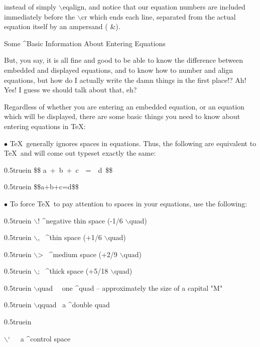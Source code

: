 instead of simply {\twltt $\backslash$eqalign}, and notice that our equation
numbers are included immediately before the {\twltt $\backslash$cr} which ends
each line, separated from the actual equation itself by an ampersand ({\twltt
\&}).
\vfill\eject
\centerline{\twlbf Some ^{Basic Information About Entering Equations}}
\bigskip\par\noindent
But, you say, it is all fine and good to be able to know the
difference between embedded and displayed equations, and to know
how to number and align equations,
but how do I actually write the damn things in the first place!{}?
Ah! Yes! I guess we should talk about that, eh?
\bigskip\par\noindent
Regardless of whether you are entering an embedded equation, or an equation
which will be displayed, there are some basic things you need to know about
entering equations in \TeX:
\bigskip\par\noindent
$\bullet$ \TeX\ generally ignores spaces
in equations. Thus, the following are equivalent to \TeX\ and will
come out typeset exactly the same:
\bigskip\par\noindent\hglue 0.5truein
{\twltt \$\$ a\ +\ b\ +\ c\ \ =\ \ d\ \$\$}
\bigskip\par\noindent\hglue 0.5truein
{\twltt \$\$a+b+c=d\$\$}
\bigskip\par\noindent
$\bullet$ To force \TeX\ to pay attention to spaces
in your equations, use the following:
\bigskip\par\noindent\hglue 0.5truein
{\twltt $\backslash$! \qquad ^{negative thin space} (-1/6 $\backslash$quad)}
\par\noindent\hglue 0.5truein
{\twltt $\backslash$, \qquad\ ^{thin space} (+1/6 $\backslash$quad)}
\par\noindent\hglue 0.5truein
{\twltt $\backslash$> \qquad\ ^{medium space} (+2/9 $\backslash$quad)}
\par\noindent\hglue 0.5truein
{\twltt $\backslash$; \qquad\ ^{thick space} (+5/18 $\backslash$quad)}
\par\noindent\hglue 0.5truein
{\twltt $\backslash$quad \ \ one ^{quad} -- approximately the size of a 
capital "M"}
\par\noindent\hglue 0.5truein
{\twltt $\backslash$qquad \ a ^{double quad}}
\par\noindent\hglue 0.5truein
{\twltt $\backslash$\char `\ \qquad\ \ a ^{control space}
\bigskip\par\noindent}
